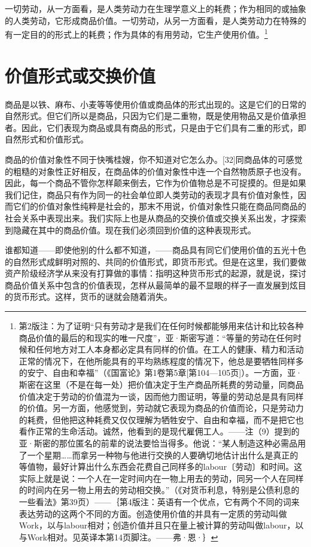 \documentclass{ctexbook}
\begin{document}
    一切劳动，从一方面看，是人类劳动力在生理学意义上的耗费；作为相同的或抽象的人类劳动，它形成商品价值。一切劳动，从另一方面看，是人类劳动力在特殊的有一定目的的形式上的耗费；作为具体的有用劳动，它生产使用价值。\footnote{第2版注：为了证明“只有劳动才是我们在任何时候都能够用来估计和比较各种商品价值的最后的和现实的唯一尺度”，亚·斯密写道：“等量的劳动在任何时候和任何地方对工人本身都必定具有同样的价值。在工人的健康、精力和活动正常的情况下，在他所能具有的平均熟练程度的情况下，他总是要牺牲同样多的安宁、自由和幸福”（《国富论》第1卷第5章[第104—105页]）。一方面，亚·斯密在这里（不是在每一处）把价值决定于生产商品所耗费的劳动量，同商品价值决定于劳动的价值混为一谈，因而他力图证明，等量的劳动总是具有同样的价值。另一方面，他感觉到，劳动就它表现为商品的价值而论，只是劳动力的耗费，但他把这种耗费又仅仅理解为牺牲安宁、自由和幸福，而不是把它也看作正常的生命活动。诚然，他看到的是现代雇佣工人。——注（9）提到的亚·斯密的那位匿名的前辈的说法要恰当得多。他说：“某人制造这种必需品用了一个星期……而拿另一种物与他进行交换的人要确切地估计出什么是真正的等值物，最好计算出什么东西会花费自己同样多的labour〔劳动〕和时间。这实际上就是说：一个人在一定时间内在一物上用去的劳动，同另一个人在同样的时间内在另一物上用去的劳动相交换。”（《对货币利息，特别是公债利息的一些看法》第39页）——｛第4版注：英语有一个优点，它有两个不同的词来表达劳动的这两个不同的方面。创造使用价值的并具有一定质的劳动叫做Work，以与labour相对；创造价值并且只在量上被计算的劳动叫做labour，以与Work相对。见英译本第14页脚注。——弗·恩·｝}

    \section{价值形式或交换价值}

    商品是以铁、麻布、小麦等等使用价值或商品体的形式出现的。这是它们的日常的自然形式。但它们所以是商品，只因为它们是二重物，既是使用物品又是价值承担者。因此，它们表现为商品或具有商品的形式，只是由于它们具有二重的形式，即自然形式和价值形式。

    商品的价值对象性不同于快嘴桂嫂，你不知道对它怎么办。[32]同商品体的可感觉的粗糙的对象性正好相反，在商品体的价值对象性中连一个自然物质原子也没有。因此，每一个商品不管你怎样颠来倒去，它作为价值物总是不可捉摸的。但是如果我们记住，商品只有作为同一的社会单位即人类劳动的表现才具有价值对象性，因而它们的价值对象性纯粹是社会的，那末不用说，价值对象性只能在商品同商品的社会关系中表现出来。我们实际上也是从商品的交换价值或交换关系出发，才探索到隐藏在其中的商品价值。现在我们必须回到价值的这种表现形式。

    谁都知道——即使他别的什么都不知道，——商品具有同它们使用价值的五光十色的自然形式成鲜明对照的、共同的价值形式，即货币形式。但是在这里，我们要做资产阶级经济学从来没有打算做的事情：指明这种货币形式的起源，就是说，探讨商品价值关系中包含的价值表现，怎样从最简单的最不显眼的样子一直发展到炫目的货币形式。这样，货币的谜就会随着消失。
\end{document}

